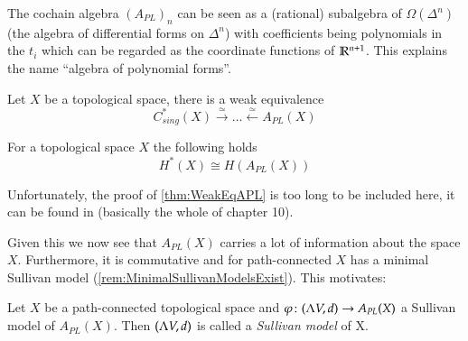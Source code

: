  The cochain algebra ${(A_{PL})}_n$ can be seen as a (rational) subalgebra of 
 $\Omega(\Delta^n)$ (the algebra of differential forms on  $\Delta^n$) with coefficients being polynomials in
 the $t_i$ which can be regarded as the coordinate functions of $\mathbb{R}^{n+1}$. This explains the name 
 ``algebra of polynomial forms''.
 
 \begin{Theorem}
 \label{thm:WeakEqAPL}
  Let $X$ be a topological space, there is a weak equivalence 
  $${C^*_{sing}(X) \overset{\simeq}{\longrightarrow} \ldots \overset{\simeq}{\longleftarrow} A_{PL}(X)}$$
 \end{Theorem}
 
 \begin{Corollary}
  For a topological space $X$ the following holds
  $$ H^*(X) \cong H(A_{PL}(X)) $$
 \end{Corollary}

 Unfortunately, the proof of \ref{thm:WeakEqAPL} is too long to be included here, it can be found
 in \cite{Felix2001} (basically the whole of chapter 10).

 Given this we now see that $A_{PL}(X)$ carries a lot of information about the space $X$. Furthermore, it is
 commutative and for path-connected $X$ has a minimal Sullivan model (\ref{rem:MinimalSullivanModelsExist}). This
 motivates:
 
 \begin{Definition}
  Let  $X$ be a path-connected topological space and $\varphi \colon (\Lambda V,d) \to A_{PL}(X)$ a Sullivan model of $A_{PL}(X)$. 
  Then $(\Lambda V,d) $ is called a \emph{Sullivan model} of X.
 \end{Definition}

